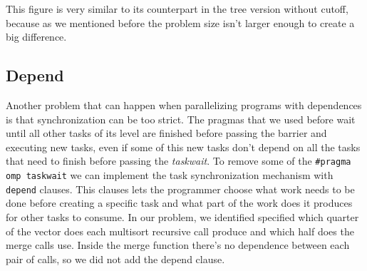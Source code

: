 \documentclass{article}
\begin{document}
This figure is very similar to its counterpart in the tree version without cutoff, because as we mentioned before the problem size isn't larger enough to create a big difference.

\justify
\subsection{Depend}
Another problem that can happen when parallelizing programs with dependences is that synchronization can be too strict. The pragmas that we used before wait until all other tasks of its level are finished before passing the barrier and executing new tasks, even if some of this new tasks don't depend on all the tasks that need to finish before passing the \textit{taskwait}.
\justify
To remove some of the \texttt{\#pragma omp taskwait} we can implement the task synchronization mechanism with \texttt{depend} \omp clauses. This clauses lets the programmer choose what work needs to be done before creating a specific task and what part of the work does it produces for other tasks to consume. 
\justify
In our problem, we identified specified which quarter of the vector does each multisort recursive call produce and which half does the merge calls use. Inside the merge function there's no dependence between each pair of calls, so we did not add the depend clause.
\end{document}

